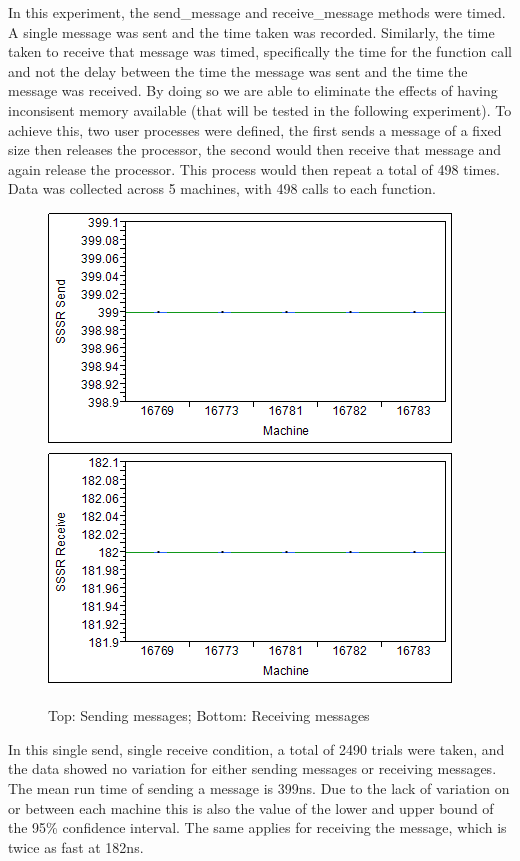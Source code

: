 \documentclass[12pt,twocolumn]{report}
\begin{document}
In this experiment, the send\_message and receive\_message methods were timed. A single message was sent and the time taken was recorded. Similarly, the time taken to receive that message was timed, specifically the time for the function call and not the delay between the time the message was sent and the time the message was received. By doing so we are able to eliminate the effects of having inconsisent memory available (that will be tested in the following experiment). To achieve this, two user processes were defined, the first sends a message of a fixed size then releases the processor, the second would then receive that message and again release the processor. This process would then repeat a total of 498 times. Data was collected across 5 machines, with 498 calls to each function.

\begin{figure}[h!]
  \centering
    \includegraphics{SSSRSend.png}
    \includegraphics{SSSRReceive.png}
  \caption{Top: Sending messages; Bottom: Receiving messages}
\end{figure}

In this single send, single receive condition, a total of 2490 trials were taken, and the data showed no variation for either sending messages or receiving messages. The mean run time of sending a message is 399ns. Due to the lack of variation on or between each machine this is also the value of the lower and upper bound of the 95\% confidence interval. The same applies for receiving the message, which is twice as fast at 182ns.
\end{document}
